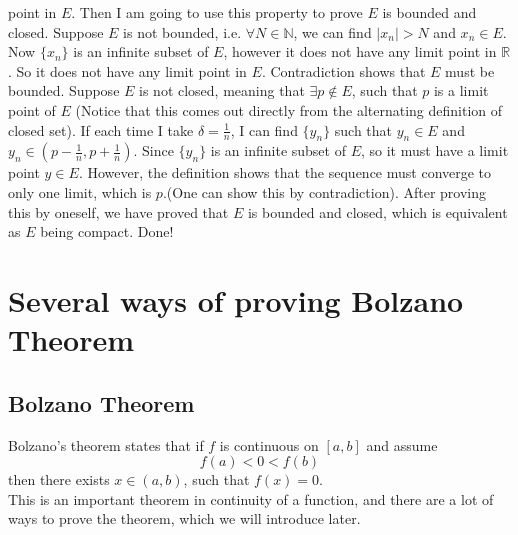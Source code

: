 \documentclass{article}
\begin{document}
point in $E$. Then I am going to use this property to prove $E$ is bounded and closed. Suppose $E$ is not bounded, i.e. $\forall N \in \mathbb{N}$, we can find $|x_n| > N$ and $x_n \in E$. Now $\{x_n\}$ is an infinite subset of 
$E$, however it does not have any limit point in $\mathbb{R}$. So it does not have any limit point in $E$. Contradiction shows that $E$ must be bounded. Suppose $E$ is not closed, meaning that $\exists p \not \in E$, such that 
$p$ is a limit point of $E$ (Notice that this comes out directly from the alternating definition of closed set). If each time I take $\delta = \frac{1}{n}$, I can find $\{y_n\}$ such that $y_n \in E$ and $y_n \in (
p - \frac{1}{n}, p + \frac{1}{n})$. Since $\{y_n\}$ is an infinite subset of $E$, so it must have a limit point $y \in E$. However, the definition shows that the sequence must converge to only one limit, which is $p$.(One can show this
by contradiction). After proving this by oneself, we have proved that $E$ is bounded and closed, which is equivalent as $E$ being compact. Done!
\newpage
\section{Several ways of proving Bolzano Theorem}
\subsection{Bolzano Theorem}
Bolzano's theorem states that if $f$ is continuous on $[a,b]$ and assume 
$$
f(a) < 0 < f(b)
$$
then there exists $x \in (a, b)$, such that $f(x) = 0$. \\
This is an important theorem in continuity of a function, and there are a lot of ways to prove the theorem, which we will introduce later.\\
\\
\\
\\
\\
\\
\end{document}
